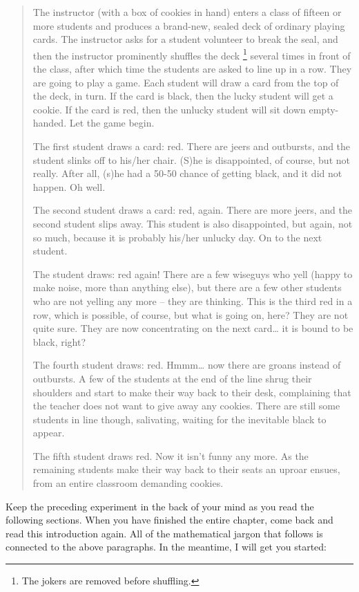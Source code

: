 \documentclass[captions=tableheading]{scrbook}
\begin{document}
\begin{quote}
The instructor (with a box of cookies in hand) enters a class of fifteen or more students and produces a brand-new, sealed deck of ordinary playing cards. The instructor asks for a student volunteer to break the seal, and then the instructor prominently shuffles the deck
\footnote{The jokers are removed before shuffling.}
several times in front of the class, after which time the students are asked to line up in a row. They are going to play a game. Each student will draw a card from the top of the deck, in turn. If the card is black, then the lucky student will get a cookie. If the card is red, then the unlucky student will sit down empty-handed. Let the game begin.

The first student draws a card: red. There are jeers and outbursts, and the student slinks off to his/her chair. (S)he is disappointed, of course, but not really. After all, (s)he had a 50-50 chance of getting black, and it did not happen. Oh well.

The second student draws a card: red, again. There are more jeers, and the second student slips away. This student is also disappointed, but again, not so much, because it is probably his/her unlucky day. On to the next student.

The student draws: red again! There are a few wiseguys who yell (happy to make noise, more than anything else), but there are a few other students who are not yelling any more -- they are thinking. This is the third red in a row, which is possible, of course, but what is going on, here? They are not quite sure. They are now concentrating on the next card\ldots{} it is bound to be black, right?

The fourth student draws: red. Hmmm\ldots{} now there are groans instead of outbursts. A few of the students at the end of the line shrug their shoulders and start to make their way back to their desk, complaining that the teacher does not want to give away any cookies. There are still some students in line though, salivating, waiting for the inevitable black to appear.

The fifth student draws red. Now it isn't funny any more. As the remaining students make their way back to their seats an uproar ensues, from an entire classroom demanding cookies.
\end{quote}

Keep the preceding experiment in the back of your mind as you read the following sections. When you have finished the entire chapter, come back and read this introduction again. All of the mathematical jargon that follows is connected to the above paragraphs. In the meantime, I will get you started:
\end{document}
